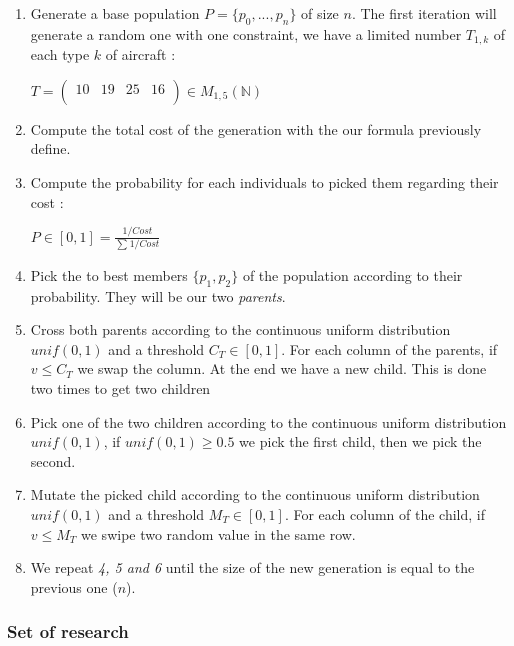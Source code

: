 \documentclass[11pt]{article}
\providecommand{\tightlist}{%
      \setlength{\itemsep}{0pt}\setlength{\parskip}{0pt}}
\begin{document}
\begin{enumerate}
\def\labelenumi{\arabic{enumi}.}
\tightlist
\item
  Generate a base population \(P = \{p_0,...,p_n\}\) of size \(n\). The
  first iteration will generate a random one with one constraint, we
  have a limited number \(T_{1,k}\) of each type \(k\) of aircraft :
  \begin{center}
  \(T = \left( \begin{array}{cccc} 10 & 19 & 25 & 16\\ \end{array} \right)\in M_{1,5}(\mathbb{N})\)
  \end{center}
\item
  Compute the total cost of the generation with the our formula
  previously define.
\item
  Compute the probability for each individuals to picked them regarding
  their cost :
  \begin{center}
  \(P \in [0,1] = \frac{1/Cost}{\sum_{}1/Cost} \)
  \end{center}
\item
  Pick the to best members \(\{p_1,p_2\}\) of the population according
  to their probability. They will be our two \emph{parents}.
\item
  Cross both parents according to the continuous uniform distribution
  \(unif(0,1)\) and a threshold \(C_T \in [0,1]\). For each column of
  the parents, if \(v \leq C_T\) we swap the column. At the end we have a
  new child. This is done two times to get two children
\item
  Pick one of the two children according to the continuous uniform
  distribution \(unif(0,1)\), if \(unif(0,1) \geq 0.5\) we pick the
  first child, then we pick the second.
\item
  Mutate the picked child according to the continuous uniform
  distribution \(unif(0,1)\) and a threshold \(M_T \in [0,1]\). For each
  column of the child, if \(v \leq M_T\) we swipe two random value in
  the same row.
\item
  We repeat \emph{4, 5 and 6} until the size of the new generation is
  equal to the previous one (\(n\)).
\end{enumerate}

\hypertarget{set-of-research}{%
\subsubsection{Set of research}\label{set-of-research}}
\end{document}
